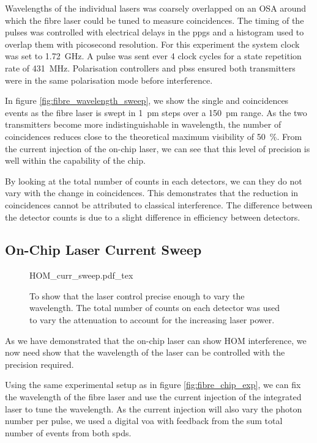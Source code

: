Wavelengths of the individual lasers was coarsely overlapped on an \ac{OSA} around which the fibre laser could be tuned to measure coincidences. The timing of the pulses was controlled with electrical delays in the \acp{ppg} and a histogram used to overlap them with picosecond resolution. For this experiment the system clock was set to \SI{1.72}{\GHz}. A pulse was sent ever 4 clock cycles for a state repetition rate of \SI{431}{\MHz}. Polarisation controllers and \acp{pbs} ensured both transmitters were in the same polarisation mode before interference.

In figure \ref{fig:fibre_wavelength_sweep}, we show the single and coincidences events as the fibre laser is swept in \SI{1}{pm} steps over a \SI{150}{pm} range. As the two transmitters become more indistinguishable in wavelength, the number of coincidences reduces close to the theoretical maximum visibility of \SI{50}{\percent}. From the current injection of the on-chip laser, we can see that this level of precision is well within the capability of the chip.

By looking at the total number of counts in each detectors, we can they do not vary with the change in coincidences. This demonstrates that the reduction in coincidences cannot be attributed to classical interference. The difference between the detector counts is due to a slight difference in efficiency between detectors.

\subsection{On-Chip Laser Current Sweep}

\begin{figure}[tp]
	\centering
	\small
	\def\svgwidth{0.8\textwidth} 
	{HOM_curr_sweep.pdf_tex}
	\caption[HOM between fibre components and chip by varying laser current]{To show that the laser control precise enough to vary the wavelength. The total number of counts on each detector was used to vary the attenuation to account for the increasing laser power.}
	\label{fig:fibre_curr_sweep}
\end{figure}

As we have demonstrated that the on-chip laser can show \ac{HOM} interference, we now need show that the wavelength of the laser can be controlled with the precision required.

Using the same experimental setup as in figure \ref{fig:fibre_chip_exp}, we can fix the wavelength of the fibre laser and use the current injection of the integrated laser to tune the wavelength. As the current injection will also vary the photon number per pulse, we used a digital \ac{voa} with feedback from the sum total number of events from both \acp{spd}. 

